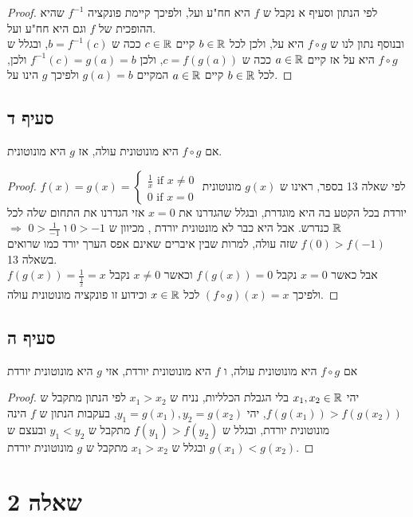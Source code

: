 \documentclass{article}
\begin{document}
	\begin{proof}
	לפי הנתון וסעיף א נקבל ש $f$ היא חח"ע ועל, ולפיכך קיימת פונקציה $f^{-1}$ שהיא ההופכית של $f$ וגם היא חח"ע ועל. \\
	ובנוסף נתון לנו ש $f \circ g$ היא על, ולכן לכל $b \in \mathbb{R}$ קיים $c \in \mathbb{R}$ ככה ש $b = f^{-1}(c)$, ובגלל ש $f \circ g$ היא על אז קיים $a \in \mathbb{R}$ ככה ש $c = f(g(a))$,
	ולכן $f^{-1}(c) = g(a) = b$ ולכן, לכל $b \in \mathbb{R}$ קיים $a \in \mathbb{R}$ המקיים $g(a) = b$ ולפיכך $g$ הינו על.
	\end{proof}

	\subsection*{סעיף ד}
	אם $f \circ g$ היא מונוטונית עולה, אז $g$ היא מונוטונית.
	\begin{proof}
		$f(x) = g(x) = \begin{cases}
			\frac{1}{x} \text{  if } x \neq 0 \\
			0 \text{  if } x = 0
		\end{cases}$
		לפי שאלה 13 בספר, ראינו ש $g(x)$ מונוטונית יורדת בכל הקטע בה היא מוגדרת, ובגלל שהגדרנו את $x=0$ אזי הגדרנו את התחום שלה לכל $\mathbb{R}$ כנדרש.
		אבל היא כבר לא מונטונית יורדת , מכיוון ש $0 > -1$ ו $0 > \frac{1}{-1}$ $\Rightarrow$ $f(0) > f(-1)$ שזה עולה, למרות שבין איברים שאינם אפס הערך יורד כמו שרואים בשאלה 13. \\
		אבל כאשר $x = 0$ נקבל $f(g(x)) = 0$ וכאשר $x \neq 0$ נקבל $f(g(x)) = \frac{1}{\frac{1}{x}} = x$ ולפיכך $(f \circ g)(x) = x$ לכל $x \in \mathbb{R}$ וכידוע זו פונקציה מונוטונית עולה.
	\end{proof}

	\subsection*{סעיף ה}
	אם $f \circ g$ היא מונוטונית עולה, ו $f$ היא מונוטונית יורדת, אזי $g$ היא מונוטונית יורדת
	\begin{proof}
		יהי $x_1, x_2 \in \mathbb{R}$ בלי הגבלת הכלליות, נניח ש $x_1 > x_2$ לפי הנתון מתקבל ש $f(g(x_1)) > f(g(x_2))$,
		יהי $y_1 = g(x_1), y_2 = g(x_2)$, בעקבות הנתון ש $f$ הינה מונוטונית יורדת, ובגלל ש $f(y_1) > f(y_2)$ מתקבל ש $y_1 < y_2$ ובעצם ש $g(x_1) < g(x_2)$ ובגלל ש $x_1 > x_2$ מתקבל ש $g$ מונוטונית יורדת.
	\end{proof}

	\pagebreak
	\section*{שאלה 2}
\end{document}
